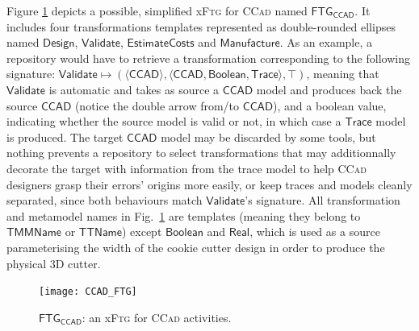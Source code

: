 Figure \ref{fig:CCAD-FTG} depicts a possible, simplified x\textsc{Ftg} for 
\textsc{CCad} named $\mathsf{FTG_{CCAD}}$. It includes four transformations 
templates represented as double-rounded ellipses named $\mathsf{Design}$, 
$\mathsf{Validate}$, $\mathsf{EstimateCosts}$ and $\mathsf{Manufacture}$. As an 
example, a repository would have to retrieve a transformation corresponding to
the following signature: $\mathsf{Validate} \mapsto 
(\langle\mathsf{CCAD}\rangle, \langle \mathsf{CCAD}, \mathsf{Boolean}, 
\mathsf{Trace}\rangle, \top)$, meaning that $\mathsf{Validate}$ is automatic and 
takes as source a $\mathsf{CCAD}$ model and produces back the source 
$\mathsf{CCAD}$ (notice the double arrow from/to $\mathsf{CCAD}$), and a 
boolean value, indicating whether the source model is valid or not, in which 
case a $\mathsf{Trace}$ model is produced. The target $\mathsf{CCAD}$ model may 
be discarded by some tools, but nothing prevents a repository to select 
transformations that may additionnally decorate the target with information 
from the trace model to help \textsc{CCad} designers grasp their errors' 
origins more easily, or keep traces and models cleanly separated, since both 
behaviours match $\mathsf{Validate}$'s signature. All transformation and 
metamodel names in Fig.~\ref{fig:CCAD-FTG} are templates (meaning they belong 
to $\mathsf{TMMName}$ or $\mathsf{TTName}$) except $\mathsf{Boolean}$ and 
$\mathsf{Real}$, which is used as a source parameterising the width of the 
cookie cutter design in order to produce the physical 3D cutter.

\begin{figure}[t]
   \centering
   \texttt{[image: CCAD\_FTG]}
   \caption{$\mathsf{FTG_{CCAD}}$: an x\textsc{Ftg} for \textsc{CCad} 
activities.}%
   \label{fig:CCAD-FTG}%
\end{figure}

